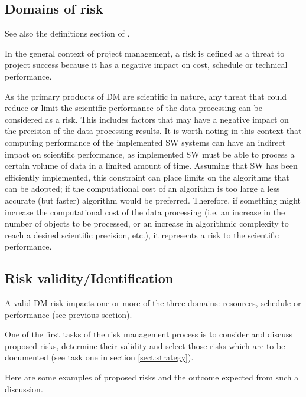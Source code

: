
\subsection{Domains of risk}
See also the definitions section of .

In the general context of project management, a risk is defined as a threat to project success because it has a negative impact on cost, schedule or technical performance. 

As the primary products of DM are scientific in nature, any threat that could reduce or limit the scientific performance of the data processing can be considered as a risk. This includes factors that may have a  negative impact on the precision of the data processing results. It is worth noting in this context that computing performance of the implemented SW systems can have an indirect impact on scientific performance, as implemented SW must be able to process a certain volume of data in a limited amount of time. Assuming that SW has been efficiently implemented, this constraint can place limits on the algorithms that can be adopted; if the computational cost of an algorithm is too large a less accurate (but faster) algorithm would be preferred. Therefore, if something might increase the computational cost of the data processing (i.e. an increase in the number of objects to be processed, or an increase in algorithmic complexity to reach a desired scientific precision, etc.), it represents a risk to the scientific performance.

\subsection{Risk validity/Identification}

A valid DM risk impacts one or more of the three domains: resources, schedule or performance (see previous section).

One of the first tasks of the risk management process is to consider and discuss proposed risks, determine their validity and select those risks which are to be documented (see task one in section \ref{sect:strategy}).

Here are some examples of proposed risks  and the outcome expected from such a discussion.

